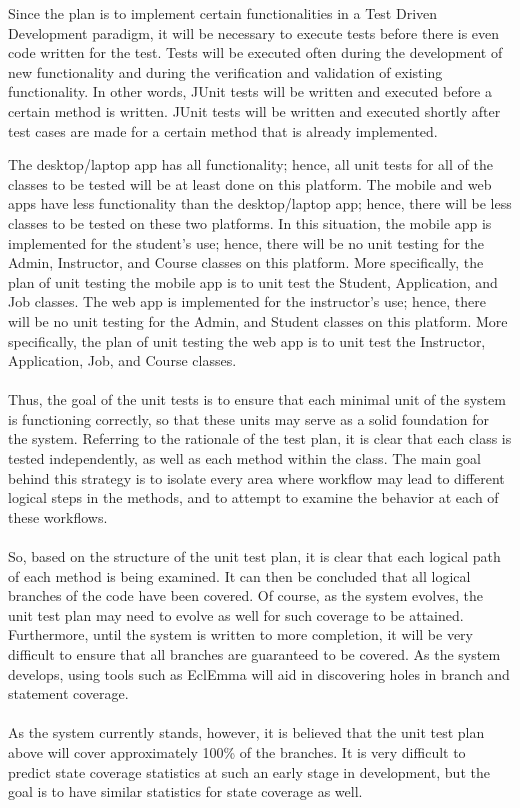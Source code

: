 \documentclass[12pt]{report}
\begin{document}
	Since the plan is to implement certain functionalities in a Test Driven Development paradigm, it
	will be necessary to execute tests before there is even code written for the test. Tests will be
	executed often during the development of new functionality and during the verification and
	validation of existing functionality. In other words, JUnit tests will be written and executed
	before a certain method is written. JUnit tests will be written and executed shortly after test
	cases are made for a certain method that is already implemented. 
    
	The desktop/laptop app has all functionality; hence, all unit tests for all of the classes to be
	tested will be at least done on this platform. The mobile and web apps have less functionality
	than the desktop/laptop app; hence, there will be less classes to be tested on these two
	platforms. 
	In this situation, the mobile app is implemented for the student's use; hence, there will be no
	unit testing for the Admin, Instructor, and Course classes on this platform. More specifically,
	the plan of unit testing the mobile app is to unit test the Student, Application, and Job
	classes. 
	The web app is implemented for the instructor's use; hence, there will be no unit testing for
	the Admin, and Student classes on this platform. More specifically, the plan of unit testing the
	web app is to unit test the Instructor, Application, Job, and Course classes.\\\\
	Thus, the goal of the unit tests is to ensure that each minimal unit of the system is
	functioning correctly, so that these units may serve as a solid foundation for the system.
	Referring to the rationale of the test plan, it is clear that each class is tested
	independently, as well as each method within the class. The main goal behind this strategy is to
	isolate every area where workflow may lead to different logical steps in the methods, and to
	attempt to examine the behavior at each of these workflows.\\\\
	So, based on the structure of the unit test plan, it is clear that each logical path of each
	method is being examined. It can then be concluded that all logical
	branches of the code have been covered. Of course, as the system evolves, the unit test plan may
	need to evolve as well for such coverage to be attained. Furthermore, until the system is
	written to more completion, it will be very difficult to ensure that all branches are guaranteed
	to be covered. As the system develops, using tools such as EclEmma will aid in discovering holes
	in branch and statement coverage.\\\\
	As the system currently stands, however, it is believed that the unit test plan above will cover
	approximately 100\% of the branches. It is very difficult to predict state coverage statistics
	at such an early stage in development, but the goal is to have similar statistics for state
	coverage as well.
\end{document}
